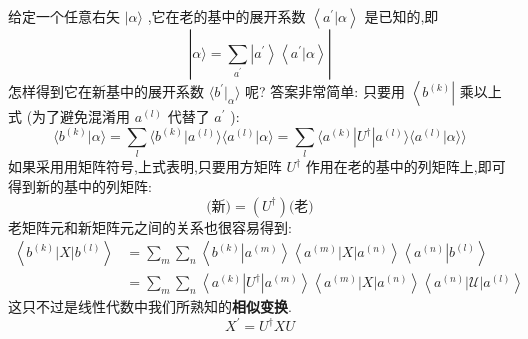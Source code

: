 \documentclass[lang=cn,newtx,10pt,scheme=chinese,thmcnt=section]{elegantbook}
\begin{document}
给定一个任意右矢 $|\alpha \rangle$ ,它在老的基中的展开系数 $\left\langle {{a}^{\prime } | \alpha }\right\rangle$ 是已知的,即
\begin{equation}
	| {\alpha \rangle = \mathop{\sum }\limits_{{a}^{\prime }}\left| {a}^{\prime }\right\rangle \left\langle {{a}^{\prime } | \alpha }\right\rangle }|
\end{equation}
怎样得到它在新基中的展开系数 $\langle {{b}^{\prime }| }_{\alpha }\rangle$ 呢? 答案非常简单: 只要用 $\left\langle {b}^{\left( k\right) }\right|$ 乘以上式 (为了避免混淆用 ${a}^{\left( l\right) }$ 代替了 ${a}^{\prime }$ ):
\begin{equation}
	\langle {{b}^{\left( k\right) } | \alpha }\rangle = \mathop{\sum }\limits_{l}\langle {{b}^{\left( k\right) }| {a}^{\left( l\right) }\rangle \langle {{a}^{\left( l\right) } | \alpha }\rangle = \mathop{\sum }\limits_{l}\langle {{a}^{\left( k\right) }| {U}^{ \dagger }| {a}^{\left( l\right) }}\rangle \langle {{a}^{\left( l\right) } | \alpha }\rangle}\rangle
\end{equation}
如果采用用矩阵符号,上式表明,只要用方矩阵 ${U}^{ \dagger }$ 作用在老的基中的列矩阵上,即可得到新的基中的列矩阵:
\begin{equation}
	\text{(新)} = ( {U}^{ \dagger }) \text{(老)}
\end{equation}
老矩阵元和新矩阵元之间的关系也很容易得到:
\begin{equation}
	\begin{aligned}
	\left\langle {{b}^{\left( k\right) }\left| X\right| {b}^{\left( l\right) }}\right\rangle &= \mathop{\sum }\limits_{m}\mathop{\sum }\limits_{n}\left\langle {{b}^{\left( k\right) }\left| {a}^{\left( m\right) }\right\rangle \left\langle {{a}^{\left( m\right) }\left| X\right| {a}^{\left( n\right) }}\right\rangle \left\langle {a}^{\left( n\right) }\right| {b}^{\left( l\right) }}\right\rangle\\
	&= \mathop{\sum }\limits_{m}\mathop{\sum }\limits_{n}\left\langle {{a}^{\left( k\right) }\left| {U}^{ \dagger }\right| {a}^{\left( m\right) }}\right\rangle \left\langle {{a}^{\left( m\right) }\left| X\right| {a}^{\left( n\right) }}\right\rangle \left\langle {{a}^{\left( n\right) }\left| \mathcal{U}\right| {a}^{\left( l\right) }}\right\rangle
	\end{aligned}
\end{equation}
这只不过是线性代数中我们所熟知的\textbf{相似变换}.
\begin{equation}
	{X}^{\prime } = {U}^{ \dagger }{XU}
\end{equation}
\end{document}

